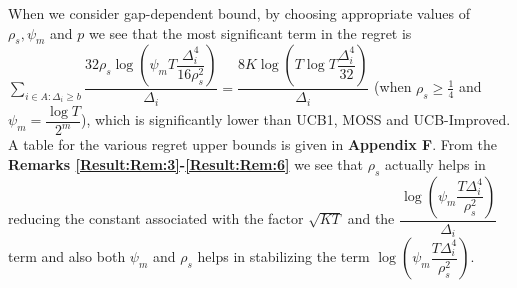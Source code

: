 
\begin{remark}
\label{Result:Rem:7}
	When we consider gap-dependent bound, by choosing appropriate values of $\rho_{s},\psi_{m}$ and $p$ we see that the most significant term in the regret is $\sum_{i\in A:\Delta_{i}\geq b}\dfrac{32\rho_{s}\log{(\psi_{m}T\dfrac{\Delta_{i}^{4}}{16\rho_{s}^{2}})}}{\Delta_{i}}= \dfrac{8K\log{(T\log T\dfrac{\Delta_{i}^{4}}{32})}}{\Delta_{i}}$ (when $\rho_{s} \geq \frac{1}{4}$ and $\psi_{m}=\dfrac{\log T}{2^{m}}$), which is significantly lower than UCB1, MOSS and UCB-Improved. A table for the various regret upper bounds is given in \textbf{Appendix F}. From the \textbf{Remarks \ref{Result:Rem:3}-\ref{Result:Rem:6}} we see that $\rho_{s}$ actually helps in reducing the constant associated with the factor $\sqrt{KT}$ and the $\dfrac{\log(\psi_{m}\dfrac{T\Delta_{i}^{4}}{\rho_{s}^{2}})}{\Delta_{i}}$ term and also both $\psi_{m}$ and $\rho_{s}$ helps in stabilizing the term $\log(\psi_{m}\dfrac{T\Delta_{i}^{4}}{\rho_{s}^{2}})$.
	
\end{remark}	



